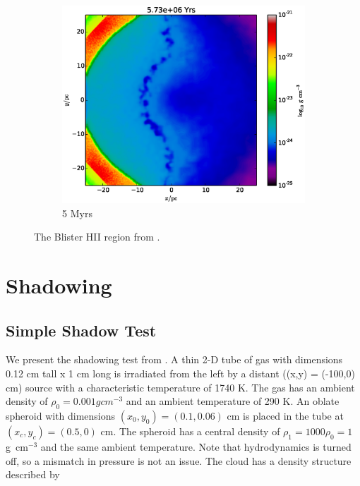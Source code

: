 \begin{figure}
\begin{subfigure}[b]{0.3\textwidth}
                \label{fig:champagne2}
        \end{subfigure}
         ~ 
        \begin{subfigure}[b]{0.3\textwidth}
                \includegraphics[width=\textwidth]{graphics/blister25600400rhoslice.eps}
                \caption{5 Myrs}
                \label{fig:champagne3}
        \end{subfigure}
        \caption[A champagne flow.]{The Blister HII region from \citet{gendelevKrumholz12}.}
        \label{fig:champagne}
\end{figure}

\section{Shadowing}
\label{sec:shadowing}

\subsection{Simple Shadow Test}
\label{sec:simpleshadow}

We present the shadowing test from \citet{hayesNorman03,gonzalezEt07,skinnerOstriker13}. A thin 2-D tube of gas with dimensions 0.12 cm tall x 1 cm long is irradiated from the left by a distant ((x,y) = (-100,0) cm) source with a characteristic temperature of 1740 K. The gas has an ambient density of $\rho_0 = 0.001 g cm^{-3}$ and an ambient temperature of 290 K. An oblate spheroid with dimensions $(x_0,y_0) = (0.1,0.06)$ cm is placed in the tube at $(x_c,y_c) = (0.5,0)$ cm. The spheroid has a central density of $\rho_1 = 1000\rho_0 = 1$ g~cm$^{-3}$ and the same ambient temperature. Note that hydrodynamics is turned off, so a mismatch in pressure is not an issue. The cloud has a density structure described by

